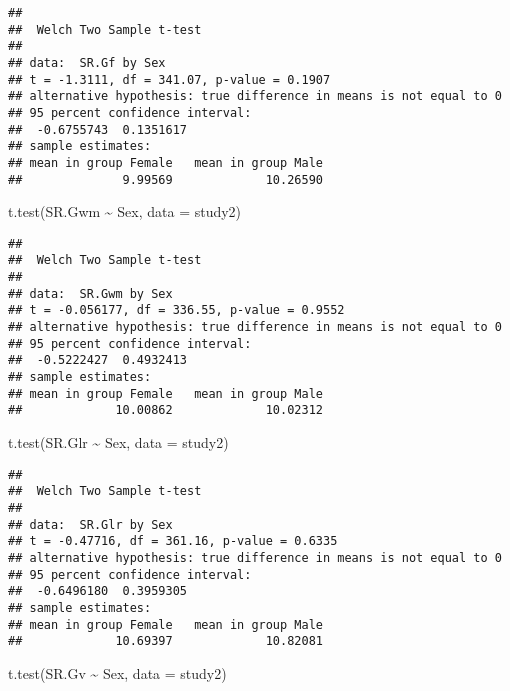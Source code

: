 \documentclass[
]{article}
\newenvironment{Shaded}{\begin{snugshade}}{\end{snugshade}}
\newcommand{\AttributeTok}[1]{\textcolor[rgb]{0.77,0.63,0.00}{#1}}
\newcommand{\FunctionTok}[1]{\textcolor[rgb]{0.00,0.00,0.00}{#1}}
\newcommand{\NormalTok}[1]{#1}
\newcommand{\SpecialCharTok}[1]{\textcolor[rgb]{0.00,0.00,0.00}{#1}}
\begin{document}
\begin{verbatim}
## 
##  Welch Two Sample t-test
## 
## data:  SR.Gf by Sex
## t = -1.3111, df = 341.07, p-value = 0.1907
## alternative hypothesis: true difference in means is not equal to 0
## 95 percent confidence interval:
##  -0.6755743  0.1351617
## sample estimates:
## mean in group Female   mean in group Male 
##              9.99569             10.26590
\end{verbatim}

\begin{Shaded}
\begin{Highlighting}[]
\FunctionTok{t.test}\NormalTok{(SR.Gwm }\SpecialCharTok{\textasciitilde{}}\NormalTok{ Sex, }\AttributeTok{data =}\NormalTok{ study2)}
\end{Highlighting}
\end{Shaded}

\begin{verbatim}
## 
##  Welch Two Sample t-test
## 
## data:  SR.Gwm by Sex
## t = -0.056177, df = 336.55, p-value = 0.9552
## alternative hypothesis: true difference in means is not equal to 0
## 95 percent confidence interval:
##  -0.5222427  0.4932413
## sample estimates:
## mean in group Female   mean in group Male 
##             10.00862             10.02312
\end{verbatim}

\begin{Shaded}
\begin{Highlighting}[]
\FunctionTok{t.test}\NormalTok{(SR.Glr }\SpecialCharTok{\textasciitilde{}}\NormalTok{ Sex, }\AttributeTok{data =}\NormalTok{ study2)}
\end{Highlighting}
\end{Shaded}

\begin{verbatim}
## 
##  Welch Two Sample t-test
## 
## data:  SR.Glr by Sex
## t = -0.47716, df = 361.16, p-value = 0.6335
## alternative hypothesis: true difference in means is not equal to 0
## 95 percent confidence interval:
##  -0.6496180  0.3959305
## sample estimates:
## mean in group Female   mean in group Male 
##             10.69397             10.82081
\end{verbatim}

\begin{Shaded}
\begin{Highlighting}[]
\FunctionTok{t.test}\NormalTok{(SR.Gv }\SpecialCharTok{\textasciitilde{}}\NormalTok{ Sex, }\AttributeTok{data =}\NormalTok{ study2)}
\end{Highlighting}
\end{Shaded}
\end{document}
